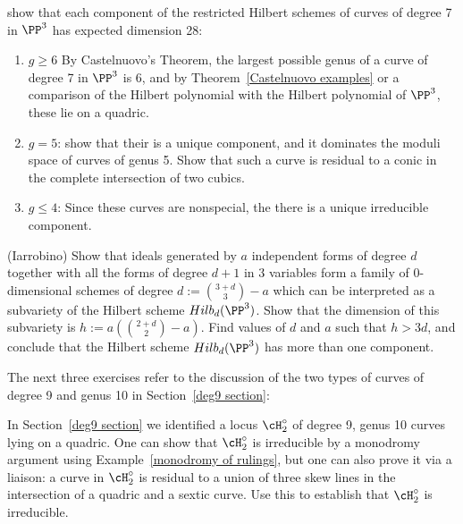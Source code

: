 \begin{exercise}\label{degree 7 analysis}
show that each component of the restricted Hilbert schemes of curves of degree 7
in $\PP^3$ has expected dimension 28:
\begin{enumerate}
 \item $g\geq 6$
By Castelnuovo's Theorem, the largest possible genus of a curve of degree 7 in $\PP^3$ is 6, and 
by Theorem~\ref{Castelnuovo examples} or a comparison of the Hilbert polynomial
with the Hilbert polynomial of $\PP^3$, these lie on a quadric.
 \item $g=5$: show that their is a unique component, and it dominates the moduli space of curves of genus 5.
 Show that such a  curve is residual to a conic in the complete intersection of two cubics.
 \item $g\leq 4$: Since these curves are nonspecial, the there is a unique irreducible component.
\end{enumerate}
\end{exercise}


\begin{exercise}\label{bigger component}(Iarrobino)
Show that ideals generated by $a$ independent forms of degree $d$ together with all the forms of degree $d+1$ in 3 variables
form a family of 0-dimensional schemes of degree $d:={3+d\choose 3} -a$ which can be interpreted as a subvariety
of the Hilbert scheme $Hilb_d(\PP^3)$. Show that the dimension of this subvariety is $h := a({2+d\choose 2}-a)$. Find values of
$d$ and $a$ such that $h>3d$, and conclude that the Hilbert scheme $Hilb_d(\PP^3)$ has more than one component.
\end{exercise}

 The next three exercises refer to the discussion of the two types of curves of degree 9 and genus 10 in Section~\ref{deg9 section}:
\begin{exercise}\label{degree 9 type 2 is irreducible}
In Section~\ref{deg9 section} we identified a locus $\cH^\circ_2$ of degree 9, genus 10 curves lying on a quadric.
One can show that $\cH^\circ_2$  is irreducible by a monodromy argument using Example~\ref{monodromy of rulings}, but one can also prove it via a liaison:  a curve in $\cH^\circ_2$ is residual to a union of three skew lines in the intersection of a quadric and a sextic curve. Use this to establish that $\cH^\circ_2$ is irreducible.
\end{exercise}

